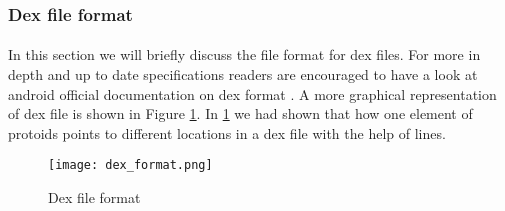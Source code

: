 \documentclass[../main.tex]{subfile}
\begin{document}
			\subsubsection{Dex file format}
			\paragraph{} In this section we will briefly discuss the file format for dex files. For more in depth and up to date specifications readers are encouraged to have a look at android official documentation on dex format \cite{dex_format}. A more graphical representation of dex file is shown in Figure \ref{fig:dex_format}. In \ref{fig:dex_format} we had shown that how one element of proto\textunderscore ids points to different locations in a dex file with the help of lines.
				\begin{figure}
					\texttt{[image: dex\_format.png]}
					\caption{Dex file format \cite{dex_image_albertini}}
					\label{fig:dex_format}
				\end{figure}
				
\end{document}
